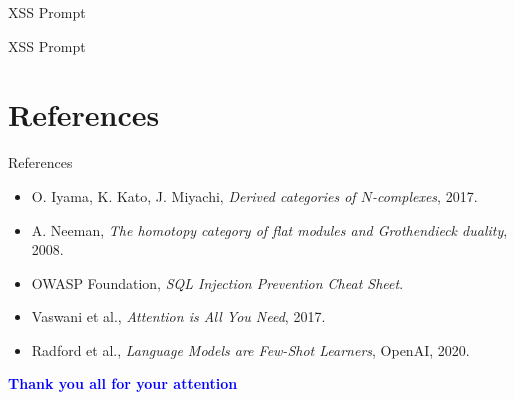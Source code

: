 \documentclass[t,ignorenonframetext]{beamer}
\begin{document}
\begin{frame}{XSS Prompt}
\begin{tcolorbox}
[colback=blue!5!white,colframe=navy!75!black,title=Context]

\end{tcolorbox}
\end{frame}

\begin{frame}{XSS Prompt}
\begin{tcolorbox}
[colback=blue!5!white,colframe=navy!75!black,title=Tasks]

\end{tcolorbox}
\end{frame}

\section{References}
\begin{frame}{References}
\tiny
\begin{itemize}
\item O. Iyama, K. Kato, J. Miyachi, \textit{Derived categories of $N$-complexes}, 2017.
\item A. Neeman, \textit{The homotopy category of flat modules and Grothendieck duality}, 2008.
\item OWASP Foundation, \textit{SQL Injection Prevention Cheat Sheet}.
\item Vaswani et al., \textit{Attention is All You Need}, 2017.
\item Radford et al., \textit{Language Models are Few-Shot Learners}, OpenAI, 2020.
\end{itemize}
\end{frame}

\begin{frame}
\vspace{3cm}
\begin{center}
\begin{LARGE}
\textcolor{blue}{\textbf{Thank you all for your attention}}
\end{LARGE}
\end{center}
\end{frame}
\end{document}
